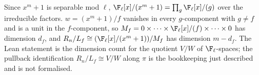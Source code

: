 Since $x^m+1$ is separable mod $\ell$, $\F_\ell[x]/(x^m+1)=\prod_g\F_\ell[x]/(g)$ over the irreducible factors. $w=(x^m+1)/f$ vanishes in every $g$-component with $g\ne f$ and is a unit in the $f$-component, so $M_f=0\times\dots\times\F_\ell[x]/(f)\times\dots\times0$ has dimension $d_f$, and $R_n/L_f\cong(\F_\ell[x]/(x^m+1))/M_f$ has dimension $m-d_f$. The Lean statement  is the dimension count for the quotient $V/W$ of $\F_\ell$-spaces; the pullback identification $R_n/L_f\cong V/W$ along $\pi$ is the bookkeeping just described and is not formalised.
